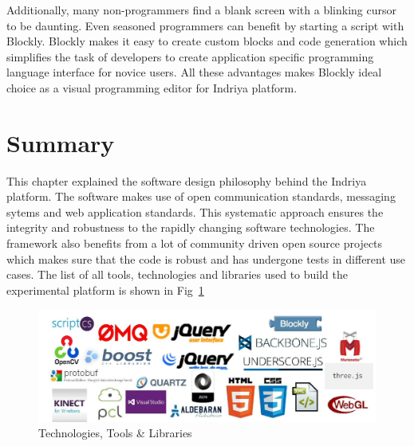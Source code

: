 Additionally, many non-programmers find a blank screen with a blinking cursor to be daunting. Even seasoned programmers can benefit by starting a script with Blockly. Blockly makes it easy to create custom blocks and code generation which simplifies the task of developers to create application specific programming language interface for novice users. All these advantages makes Blockly ideal choice as a visual programming editor for Indriya platform.
\section{Summary}
This chapter explained the software design philosophy behind the Indriya platform. The software makes use of open communication standards, messaging sytems and web application standards. This systematic approach ensures the integrity and robustness to the rapidly changing software technologies. The framework also benefits from a lot of community driven open source projects which makes sure that the code is robust and has undergone tests in different use cases. The list of all tools, technologies and libraries used to build the experimental platform is shown in Fig~\ref{fig:libraries_used}
\begin{figure}
\centering
\includegraphics[width=\textwidth]{assets/libs.jpg}
\caption[Technologies, Tools \& Libraries]{Technologies, Tools \& Libraries}
\label{fig:libraries_used}
\end{figure}

